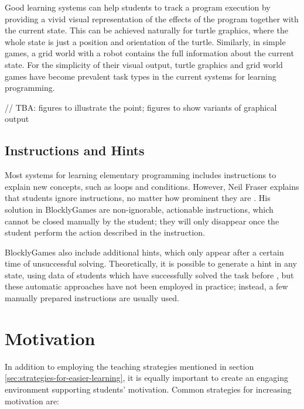 Good learning systems can help students to track a program execution
  by providing a vivid visual representation of the effects of the program
  together with the current state.
This can be achieved naturally for turtle graphics,
  where the whole state is just a position and orientation of the turtle.
Similarly, in simple games, a grid world with a robot
  contains the full information about the current state.
For the simplicity of their visual output,
  turtle graphics and grid world games have become prevalent task types
  in the current systems for learning programming.

// TBA: figures to illustrate the point; figures to show variants of graphical output


\subsection{Instructions and Hints}
\label{sec:instructions-and-hints}

Most systems for learning elementary programming includes instructions
  to explain new concepts, such as loops and conditions.
However, Neil Fraser explains that students ignore instructions,
  no matter how prominent they are \cite{blockly-10-things}.
His solution in BlocklyGames are non-ignorable, actionable instructions,
  which cannot be closed manually by the student;
  they will only disappear once the student perform the action described in the instruction.

BlocklyGames also include additional hints,
  which only appear after a certain time of unsuccessful solving.
Theoretically, it is possible to generate a hint in any state,
  using data of students which have successfully solved the task before
  \cite{generating-hints},
  but these automatic approaches have not been employed in practice;
  instead, a few manually prepared instructions are usually used.



\section{Motivation}
\label{sec:motivation}

In addition to employing the teaching strategies mentioned in section \ref{sec:strategies-for-easier-learning},
  it is equally important to create an engaging environment supporting students’ motivation. Common strategies for increasing motivation are:

